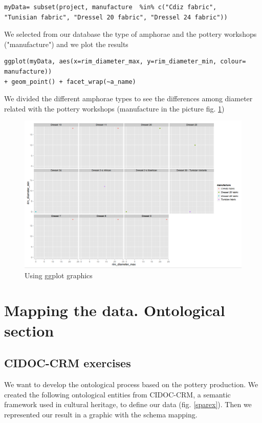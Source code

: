 \documentclass[10pt,a4paper]{article}
\begin{document}
\begin{verbatim}
myData= subset(project, manufacture  %in% c("Cdiz fabric", 
"Tunisian fabric", "Dressel 20 fabric", "Dressel 24 fabric"))

\end{verbatim}

We selected from our database the type of amphorae and the pottery workshops ("manufacture") and we plot the results 

\begin{verbatim}
ggplot(myData, aes(x=rim_diameter_max, y=rim_diameter_min, colour= manufacture)) 
+ geom_point() + facet_wrap(~a_name)
\end{verbatim}

We divided the different amphorae types to see the differences among diameter related with the pottery workshops (manufacture in the picture fig. \ref{ggplotex})


\begin{figure}[htp]
\centering
\includegraphics[scale=0.40]{ggplot2ex.png}
\caption{Using ggplot graphics}
\label{ggplotex}
\end{figure}


\section{Mapping the data. Ontological section}

\subsection{CIDOC-CRM exercises}

We want to develop the ontological process based on the pottery production. We created the following ontological entities from CIDOC-CRM, a semantic framework used in cultural heritage, to define our data (fig. \ref{sparex}). Then we represented our result in a graphic with the schema mapping. 
\end{document}
